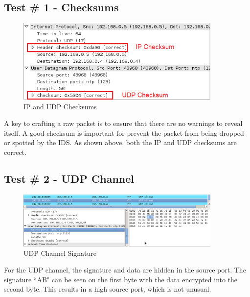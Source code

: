 \documentclass[titlepage]{article}
\begin{document}
\subsection{Test \# 1 - Checksums}

\begin{figure}[htb]                                                                       
  \begin{center}
    \includegraphics[width=0.9\textwidth]{Pictures/Checksum.png}
  \end{center}
  \caption{IP and UDP Checksums}
  \label{fig:checksums}
\end{figure}

A key to crafting a raw packet is to ensure that there are no warnings to reveal itself.
A good checksum is important for prevent the packet from being dropped or spotted by the IDS.
As shown above, both the IP and UDP checksums are correct.\\

\subsection{Test \# 2 - UDP Channel}

\begin{figure}[htb]                                                                       
  \begin{center}
    \includegraphics[width=0.9\textwidth]{Pictures/UDP_SIG.png}
  \end{center}
  \caption{UDP Channel Signature}
  \label{fig:udp_sig}
\end{figure}

For the UDP channel, the signature and data are hidden in the source port.  The signature ``AB"
can be seen on the first byte with the data encrypted into the second byte.  This results in
a high source port, which is not unusual.
\end{document}

